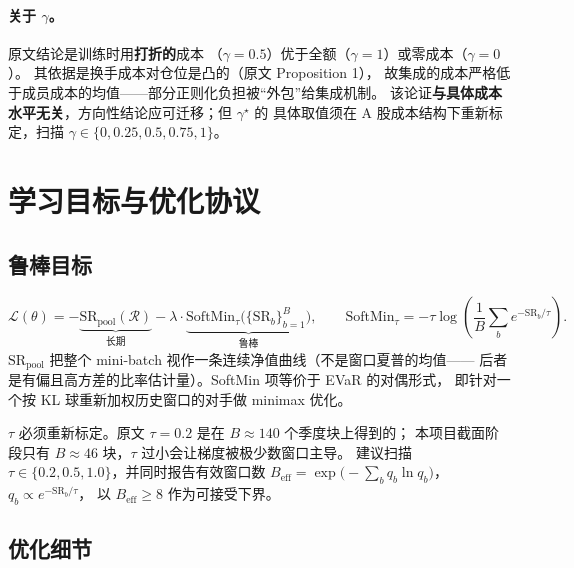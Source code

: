 \documentclass[11pt, a4paper]{ctexart}
\begin{document}
\paragraph{关于 $\gamma$。}原文结论是训练时用\textbf{打折的}成本
（$\gamma=0.5$）优于全额（$\gamma=1$）或零成本（$\gamma=0$）。
其依据是换手成本对仓位是凸的（原文 Proposition 1），
故集成的成本严格低于成员成本的均值——部分正则化负担被“外包”给集成机制。
该论证\textbf{与具体成本水平无关}，方向性结论应可迁移；但 $\gamma^\star$ 的
具体取值须在 A 股成本结构下重新标定，扫描 $\gamma \in \{0, 0.25, 0.5, 0.75, 1\}$。

\section{学习目标与优化协议}

\subsection{鲁棒目标}
\begin{equation}
\mathcal{L}(\theta) = -\underbrace{\mathrm{SR}_{\text{pool}}(\mathcal{R})}_{\text{长期}}
  - \lambda\cdot \underbrace{\mathrm{SoftMin}_\tau\bigl(\{\mathrm{SR}_b\}_{b=1}^{B}\bigr)}_{\text{鲁棒}},
\qquad
\mathrm{SoftMin}_\tau = -\tau\log\!\left(\frac{1}{B}\sum_b e^{-\mathrm{SR}_b/\tau}\right).
\end{equation}
$\mathrm{SR}_{\text{pool}}$ 把整个 mini-batch 视作一条连续净值曲线（不是窗口夏普的均值——
后者是有偏且高方差的比率估计量）。SoftMin 项等价于 EVaR 的对偶形式，
即针对一个按 KL 球重新加权历史窗口的对手做 minimax 优化。

\begin{warnbox}
$\tau$ 必须重新标定。原文 $\tau{=}0.2$ 是在 $B\approx 140$ 个季度块上得到的；
本项目截面阶段只有 $B\approx 46$ 块，$\tau$ 过小会让梯度被极少数窗口主导。
建议扫描 $\tau\in\{0.2, 0.5, 1.0\}$，并同时报告有效窗口数
$B_{\text{eff}} = \exp\bigl(-\sum_b q_b\ln q_b\bigr)$，$q_b \propto e^{-\mathrm{SR}_b/\tau}$，
以 $B_{\text{eff}} \ge 8$ 作为可接受下界。
\end{warnbox}

\subsection{优化细节}
\end{document}
